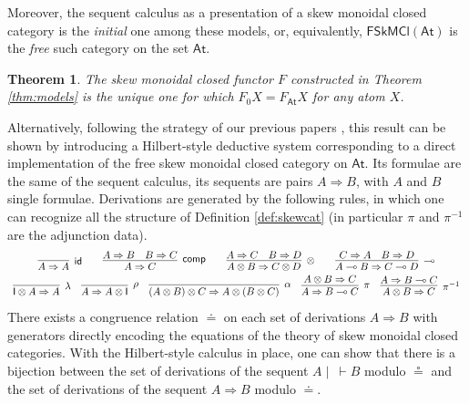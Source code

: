 \documentclass[copyright,creativecommons]{eptcs}
\newtheorem{theorem}{Theorem}[section]
\theoremstyle{definition}
\newcommand{\id}{\mathsf{id}}
\newcommand{\ot}{\otimes}
\newcommand{\lolli}{\multimap}
\newcommand{\I}{\mathsf{I}}
\newcommand{\FSkMCC}{\mathsf{FSkMCl}}
\begin{document}
Moreover, the sequent calculus as a presentation of a skew monoidal closed category is the \emph{initial} one among these
models, or, equivalently, $\FSkMCC(\mathsf{At})$ is the \emph{free}
such category on the set $\mathsf{At}$.

\begin{theorem}\label{thm:unique}
  The skew monoidal closed functor $F$ constructed in Theorem \ref{thm:models} 
  is the unique one for which $F_0 X = F_{\mathsf{At}} X$ for any atom $X$.
\end{theorem}

Alternatively, following the strategy of our previous papers \cite{uustalu:sequent:2021,uustalu:proof:nodate,uustalu:deductive:nodate,veltri:coherence:2021}, this result can be shown by introducing a Hilbert-style deductive system corresponding to a direct implementation of the free skew monoidal closed category on $\mathsf{At}$. Its formulae are the same of the sequent calculus, its sequents are pairs $A \Rightarrow B$, with $A$ and $B$ single formulae. Derivations are generated by the following rules, in which one can  recognize all the structure of Definition \ref{def:skewcat} (in particular $\pi$ and $\pi^{-1}$ are the adjunction data).
\begin{displaymath}
  \def\arraystretch{1.5}
  \begin{array}{c}
        \infer[\id]{A \Rightarrow A}{}
        \qquad
        \infer[\mathsf{comp}]{A \Rightarrow C}{
          A \Rightarrow B
          &
          B \Rightarrow C
        }
        \qquad
      \infer[\otimes]{A \ot B \Rightarrow C \ot D}{
        A \Rightarrow C
        &
        B \Rightarrow D
      }
      \qquad
      \infer[\lolli]{A \lolli B \Rightarrow C \lolli D}{
        C \Rightarrow A
        &
        B \Rightarrow D
      }
      \\
      \infer[\lambda]{\I \ot A \Rightarrow A}{}
      \quad
      \infer[\rho]{A \Rightarrow A \ot \I}{}
      \quad
      \infer[\alpha]{(A \ot B) \ot C \Rightarrow A \ot (B \ot C)}{}
      \quad
      \infer[\pi]{A \Rightarrow B \lolli C}{A \ot B \Rightarrow C}
      \quad
      \infer[\pi^{-1}]{A \ot B \Rightarrow C}{A \Rightarrow B \lolli C}
  \end{array}
\end{displaymath}
There exists a congruence relation $\doteq$ on each set of derivations $A \Rightarrow B$ with generators directly encoding the equations of the theory of skew monoidal closed categories. With the Hilbert-style calculus in place, one can show that there is a bijection between the set of derivations of the sequent $A \mid ~ \vdash B$ modulo $\circeq$ and the set of derivations of the sequent $A \Rightarrow B$ modulo $\doteq$.
\end{document}
